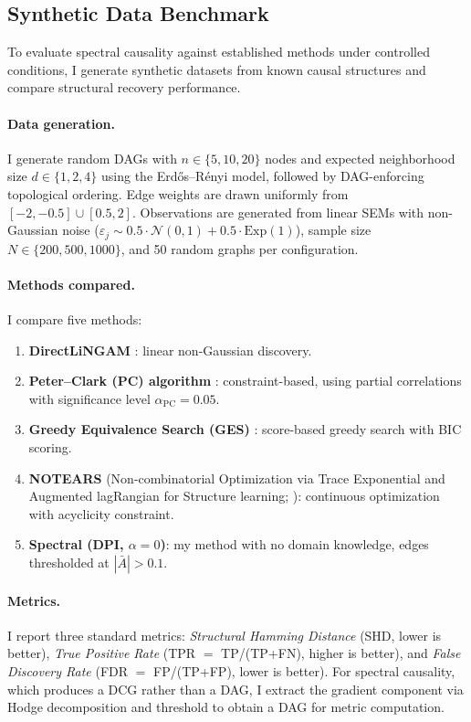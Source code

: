\documentclass[twoside,11pt]{article}
\begin{document}
\subsection{Synthetic Data Benchmark}
\label{sec:synthetic}

To evaluate spectral causality against established methods under
controlled conditions, I generate synthetic datasets from known causal
structures and compare structural recovery performance.

\paragraph{Data generation.}
I generate random DAGs with $n\in\{5,10,20\}$ nodes and expected
neighborhood size $d\in\{1,2,4\}$ using the Erd\H{o}s--R\'{e}nyi model,
followed by DAG-enforcing topological ordering.  Edge weights are drawn
uniformly from $[-2,-0.5]\cup[0.5,2]$.  Observations are generated from
linear SEMs with non-Gaussian noise
($\varepsilon_j\sim 0.5\cdot\mathcal{N}(0,1)+0.5\cdot\mathrm{Exp}(1)$),
sample size $N\in\{200,500,1000\}$, and 50 random graphs per
configuration.

\paragraph{Methods compared.}
I compare five methods:
\begin{enumerate}
\item[\emph{(i)}] \textbf{DirectLiNGAM} \citep{Shimizu2011}: linear
  non-Gaussian discovery.
\item[\emph{(ii)}] \textbf{Peter--Clark (PC) algorithm} \citep{Spirtes2000}:
  constraint-based, using partial correlations with significance level
  $\alpha_{\mathrm{PC}}=0.05$.
\item[\emph{(iii)}] \textbf{Greedy Equivalence Search (GES)} \citep{Chickering2002}:
  score-based greedy search with BIC scoring.
\item[\emph{(iv)}] \textbf{NOTEARS} (Non-combinatorial Optimization via Trace
  Exponential and Augmented lagRangian for Structure learning;
  \citealp{Zheng2018}): continuous optimization with acyclicity constraint.
\item[\emph{(v)}] \textbf{Spectral (DPI, $\alpha=0$)}: my method with
  no domain knowledge, edges thresholded at $|\bar{A}|>0.1$.
\end{enumerate}

\paragraph{Metrics.}
I report three standard metrics:
\emph{Structural Hamming Distance} (SHD, lower is better),
\emph{True Positive Rate} (TPR $=$ TP/(TP+FN), higher is better),
and \emph{False Discovery Rate} (FDR $=$ FP/(TP+FP), lower is better).
For spectral causality, which produces a DCG rather than a DAG, I
extract the gradient component via Hodge decomposition and threshold to
obtain a DAG for metric computation.
\end{document}

